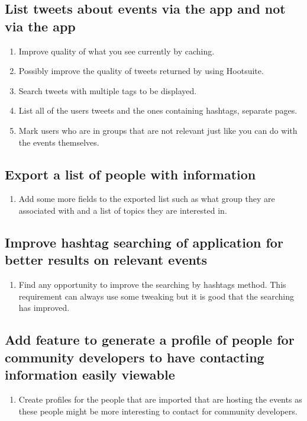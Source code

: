 \documentclass[draftclsnofoot,10pt,onecolumn]{IEEEtran} %
\begin{document}
\subsection{List tweets about events via the app and not via the app}
\begin{enumerate}
	\item Improve quality of what you see currently by caching.
    \item Possibly improve the quality of tweets returned by using Hootsuite.
    \item Search tweets with multiple tags to be displayed.
    \item List all of the users tweets and the ones containing hashtags, separate pages.
    \item Mark users who are in groups that are not relevant just like you can do with the events themselves.
\end{enumerate}

\subsection{Export a list of people with information}
\begin{enumerate}
	\item Add some more fields to the exported list such as what group they are associated with and a list of topics they are interested in.
\end{enumerate}

\subsection{Improve hashtag searching of application for better results on relevant events}
\begin{enumerate}
	\item Find any opportunity to improve the searching by hashtags method. This requirement can always use some tweaking but it is good that the searching has improved.
\end{enumerate}

\subsection{Add feature to generate a profile of people for community developers to have contacting information easily viewable}
\begin{enumerate}
	\item Create profiles for the people that are imported that are hosting the events as these people might be more interesting to contact for community developers.
\end{enumerate}
\end{document}
